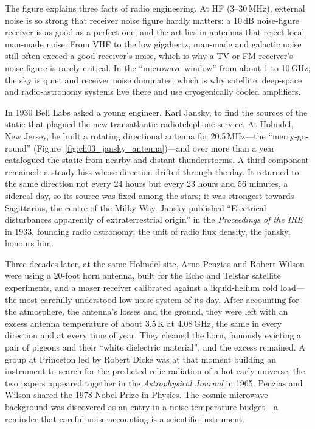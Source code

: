 The figure explains three facts of radio engineering. At HF (3--30\,MHz), external noise is so strong
that receiver noise figure hardly matters: a 10\,dB noise-figure receiver is as good as a perfect one, and
the art lies in antennas that reject local man-made noise. From VHF to the low gigahertz, man-made and
galactic noise still often exceed a good receiver's noise, which is why a TV or FM receiver's noise figure
is rarely critical. In the ``microwave window'' from about 1 to 10\,GHz, the sky is quiet and receiver
noise dominates, which is why satellite, deep-space and radio-astronomy systems live there and use
cryogenically cooled amplifiers.


\begin{history}
In 1930 Bell Labs asked a young engineer, Karl Jansky, to find the sources of the static that plagued
the new transatlantic radiotelephone service. At Holmdel, New Jersey, he built a rotating directional
antenna for 20.5\,MHz---the ``merry-go-round'' (Figure~\ref{fig:ch03_jansky_antenna})---and over more than
a year catalogued the static from nearby and distant thunderstorms. A third component remained: a steady
hiss whose direction drifted through the day. It returned to the same direction not every 24 hours but
every 23 hours and 56 minutes, a sidereal day, so its source was fixed among the stars; it was strongest
towards Sagittarius, the centre of the Milky Way. Jansky published ``Electrical disturbances apparently of
extraterrestrial origin'' in the \emph{Proceedings of the IRE} in 1933, founding radio astronomy; the unit
of radio flux density, the jansky, honours him.

Three decades later, at the same Holmdel site, Arno Penzias and Robert Wilson were using a 20-foot horn
antenna, built for the Echo and Telstar satellite experiments, and a maser receiver calibrated against a
liquid-helium cold load---the most carefully understood low-noise system of its day. After accounting for
the atmosphere, the antenna's losses and the ground, they were left with an excess antenna temperature of
about 3.5\,K at 4.08\,GHz, the same in every direction and at every time of year. They cleaned the horn,
famously evicting a pair of pigeons and their ``white dielectric material'', and the excess remained. A
group at Princeton led by Robert Dicke was at that moment building an instrument to search for the
predicted relic radiation of a hot early universe; the two papers appeared together in the
\emph{Astrophysical Journal} in 1965. Penzias and Wilson shared the 1978 Nobel Prize in Physics. The
cosmic microwave background was discovered as an entry in a noise-temperature budget---a reminder that
careful noise accounting is a scientific instrument.
\end{history}

